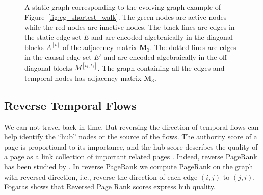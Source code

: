 \documentclass[12pt]{article}
\theoremstyle{definition}
\begin{document}
\begin{figure}[h]
 \begin{center}
\end{center}
\caption{A static graph corresponding to the evolving graph example of
Figure~\ref{fig:eg_shortest_walk}. The green nodes are active nodes while the
red nodes are inactive nodes.
The black lines are edges in the static edge set $\tilde E$ and are encoded
algebraically in the diagonal blocks $A^{[t]}$ of the adjacency matrix $\bm M_3$.
The dotted lines are edges in the causal edge set $E'$ and are encoded algebraically in
the off-diagonal blocks $M^{[t_i, t_j]}$.
The graph containing all the edges and temporal nodes has adjacency matrix $\bm M_3$.}
\label{fig:static}
\end{figure}


\subsection{Reverse Temporal Flows}
\label{sec:reverse-temp-flows}

We can not travel back in time. But reversing the direction of temporal flows can help
identify the ``hub'' nodes or the source of the flows. The authority score of a page is
proportional to its importance, and the hub score describes the quality of a page as a link collection of important related pages \cite{kleinberg99}.
Indeed, reverse PageRank has
been studied by \cite{bar08, fogaras03, gleich15}. In reverse PageRank we compute PageRank on the graph with reversed direction, i.e., reverse the direction of each edge $(i,j)$ to $(j, i)$.
Fogaras \cite{fogaras03} shows that Reversed Page Rank scores express hub quality.
\end{document}
